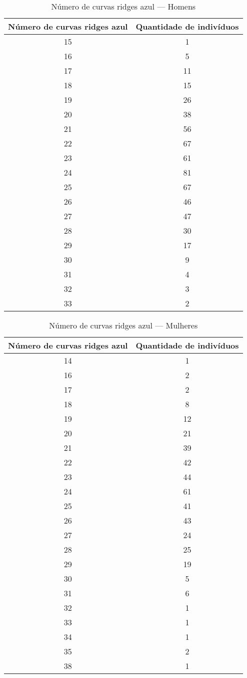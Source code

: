 \documentclass[a4paper,12pt]{article}
\begin{document}
\begin{table}[h!]
\centering
\caption{Número de curvas ridges azul — Homens}
\begin{tabular}{c c}
\hline
\textbf{Número de curvas ridges azul} & \textbf{Quantidade de indivíduos} \\ 
\hline
15 & 1  \\
16 & 5  \\
17 & 11 \\
18 & 15 \\
19 & 26 \\
20 & 38 \\
21 & 56 \\
22 & 67 \\
23 & 61 \\
24 & 81 \\
25 & 67 \\
26 & 46 \\
27 & 47 \\
28 & 30 \\
29 & 17 \\
30 & 9  \\
31 & 4  \\
32 & 3  \\
33 & 2  \\
\hline
\end{tabular}
\end{table}


\begin{table}[h!]
\centering
\caption{Número de curvas ridges azul — Mulheres}
\begin{tabular}{c c}
\hline
\textbf{Número de curvas ridges azul} & \textbf{Quantidade de indivíduos} \\ 
\hline
14 & 1  \\
16 & 2  \\
17 & 2  \\
18 & 8  \\
19 & 12 \\
20 & 21 \\
21 & 39 \\
22 & 42 \\
23 & 44 \\
24 & 61 \\
25 & 41 \\
26 & 43 \\
27 & 24 \\
28 & 25 \\
29 & 19 \\
30 & 5  \\
31 & 6  \\
32 & 1  \\
33 & 1  \\
34 & 1  \\
35 & 2  \\
38 & 1  \\
\hline
\end{tabular}
\end{table}
\end{document}
